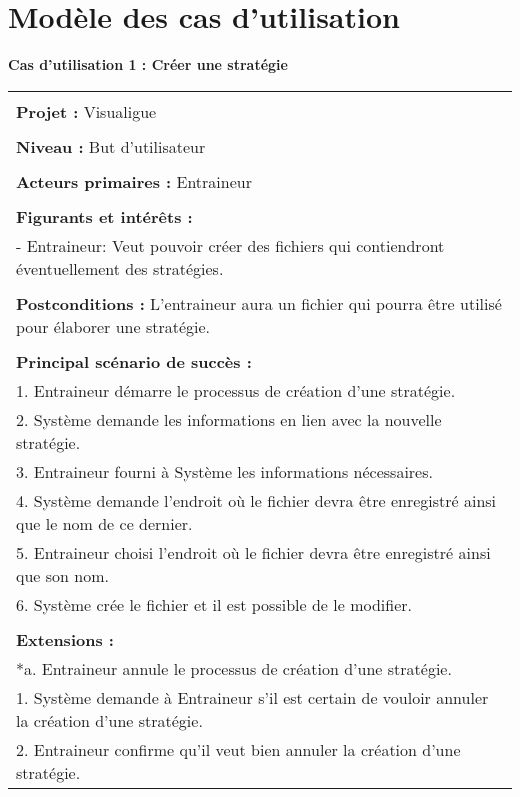 \chapter{Modèle des cas d'utilisation}
\label{s:use_cases}
\newpage
\begin{flushleft}
	\textbf{Cas d'utilisation 1 : Créer une stratégie}\\
\end{flushleft}
\begin{tabular}{|p{16cm}|}
	\hline
	\\
	\textbf{Projet :} Visualigue\\
	\\
	\textbf{Niveau :} But d'utilisateur\\
	\\
	\textbf{Acteurs primaires :} Entraineur\\
	\\
	\textbf{Figurants et intérêts :} \\
	- Entraineur: Veut pouvoir créer des fichiers qui contiendront éventuellement des stratégies.\\
	\\
	\textbf{Postconditions :} L'entraineur aura un fichier qui pourra être utilisé pour élaborer une stratégie.\\
	\\
	\textbf{Principal scénario de succès :}\\
	1. Entraineur démarre le processus de création d'une stratégie.\\
	2. Système demande les informations en lien avec la nouvelle stratégie.\\
	3. Entraineur fourni à Système les informations nécessaires.\\
	4. Système demande l'endroit où le fichier devra être enregistré ainsi que le nom de ce dernier.\\
	5. Entraineur choisi l'endroit où le fichier devra être enregistré ainsi que son nom.\\
	6. Système crée le fichier et il est possible de le modifier.\\
	\\
	\textbf{Extensions :}\\
	*a. Entraineur annule le processus de création d'une stratégie.\\
	\hspace{1cm}1. Système demande à Entraineur s'il est certain de vouloir annuler la création d'une stratégie.\\
	\hspace{1cm}2. Entraineur confirme qu'il veut bien annuler la création d'une stratégie.\\

\end{tabular}
